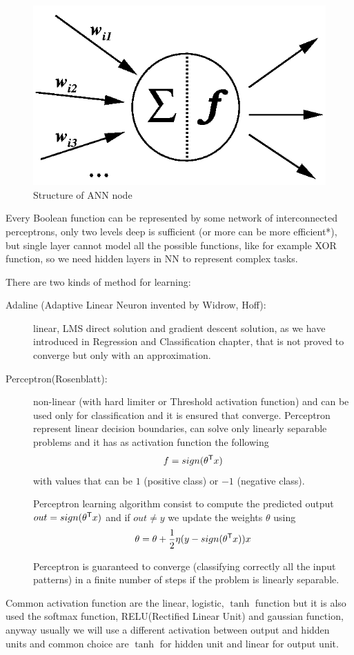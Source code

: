\begin{figure}
    \caption{Structure of ANN node}
    \label{img:neuron}
    \includegraphics[width=\textwidth]{images/artificialNeuron}
\end{figure}
Every Boolean function can be represented by some network of interconnected perceptrons, only two levels deep is sufficient (or more can be more efficient*), but single layer 
cannot model all the possible functions, like for example XOR function, so we need hidden layers in NN to represent complex tasks.

There are two kinds of method for learning:
\begin{description}
    \item[Adaline (Adaptive Linear Neuron invented by Widrow, Hoff):] linear, LMS direct solution and gradient descent solution, as we have introduced in Regression and Classification chapter,
	    							      that is not proved to converge but only with an approximation.
    \item [Perceptron(Rosenblatt):] non-linear (with hard limiter or Threshold activation function) and can be used only for classification and it is ensured that converge.
	    			    Perceptron represent linear decision boundaries, can solve only linearly separable problems and it has as activation function the following
				    \[ f = sign(\theta ^ \mathsf{T}x) \]
				    with values that can be $1$ (positive class) or $-1$ (negative class).
					
				   Perceptron learning algorithm consist to compute the predicted output $out = sign(\theta ^ \mathsf{T}x)$ and if $out \neq y$ we update the weights $\theta$ using
				   \[ \theta = \theta + \frac{1}{2} \eta (y - sign(\theta ^ \mathsf{T}x)) x \]

				   \begin{thm}
					   Perceptron is guaranteed to converge (classifying correctly all the input patterns) in a finite number of steps if the problem is linearly separable.
				   \end{thm}
\end{description}
Common activation function are the linear, logistic, $\tanh$ function but it is also used the softmax function, RELU(Rectified Linear Unit) and gaussian function,
anyway usually we will use a different activation between output and hidden units and common choice are $\tanh$ for hidden unit and linear for output unit.

